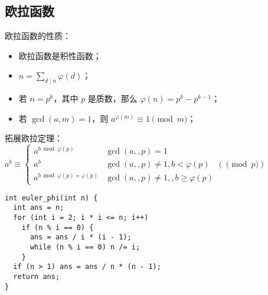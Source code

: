 \subsection{欧拉函数}

欧拉函数的性质：
\begin{itemize}
\item 欧拉函数是积性函数；
\item $n = \sum_{d \mid n}{\varphi(d)}$；
\item 若 $n = p^k$，其中 $p$ 是质数，那么 $\varphi(n) = p^k - p^{k - 1}$；
\item 若 $\gcd(a, m) = 1$，则 $a^{\varphi(m)} \equiv 1 \pmod{m}$；
\end{itemize}

拓展欧拉定理：
$a^b \equiv \begin{cases} a^{b\bmod\varphi(p)} &\gcd(a,,p)=1 \\
    a^b &\gcd(a,,p)\ne1, b<\varphi(p)\\
    a^{b\bmod\varphi(p)+\varphi(p)} &\gcd(a,,p)\ne1,,b\ge\varphi(p) \end{cases}
  (\pmod p)$

\begin{lstlisting}
int euler_phi(int n) {
  int ans = n;
  for (int i = 2; i * i <= n; i++)
    if (n % i == 0) {
      ans = ans / i * (i - 1);
      while (n % i == 0) n /= i;
    }
  if (n > 1) ans = ans / n * (n - 1);
  return ans;
}
\end{lstlisting}
